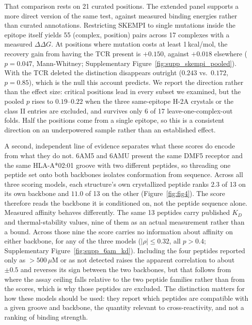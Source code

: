 \documentclass[letterpaper]{article}
\begin{document}
That comparison rests on 21 curated positions. The extended panel supports a more direct version of
the same test, against measured binding energies rather than curated annotations. Restricting SKEMPI
to single mutations inside the epitope itself yields 55 (complex, position) pairs across 17 complexes
with a measured $\Delta\Delta G$. At positions where mutation costs at least 1\,kcal/mol, the recovery
gain from having the TCR present is $+0.150$, against $+0.018$ elsewhere ($p=0.047$, Mann-Whitney;
Supplementary Figure~\ref{fig:supp_skempi_pooled}). With the TCR deleted the distinction disappears
outright ($0.243$ vs.\ $0.172$, $p=0.85$), which is the null this account predicts. We report the
direction rather than the effect size: critical positions lead in every subset we examined, but the
pooled $p$ rises to $0.19$--$0.22$ when the three same-epitope H-2A crystals or the class II entries
are excluded, and survives only 6 of 17 leave-one-complex-out folds. Half the positions come from a
single epitope, so this is a consistent direction on an underpowered sample rather than an
established effect.

A second, independent line of evidence separates what these scores do encode from what they do not.
6AM5 and 6AMU present the same DMF5 receptor and the same HLA-A*02:01 groove with two different
peptides, so threading one peptide set onto both backbones isolates conformation from sequence.
Across all three scoring models, each structure's own crystallized peptide ranks $2.3$ of 13 on its
own backbone and $11.0$ of 13 on the other (Figure~\ref{fig:fig4}). The score
therefore reads the backbone it is conditioned on, not the peptide sequence alone. Measured affinity
behaves differently. The same 13 peptides carry published $K_D$ and thermal-stability values, nine of
them as an actual measurement rather than a bound. Across those nine the score carries no
information about affinity on either backbone, for any of the three models
($|\rho|\leq0.32$, all $p>0.4$; Supplementary Figure~\ref{fig:supp_6am_kd}). Including the four
peptides reported only as $>500\,\mu$M or as not detected raises the apparent correlation to about
$\pm0.5$ and reverses its sign between the two backbones, but that follows from where the assay
ceiling falls relative to the two peptide families rather than from the scores, which is why those
peptides are excluded. The distinction matters for how these models should be used: they report
which peptides are compatible with a given groove and backbone, the quantity relevant to
cross-reactivity, and not a ranking of binding strength.
\end{document}
